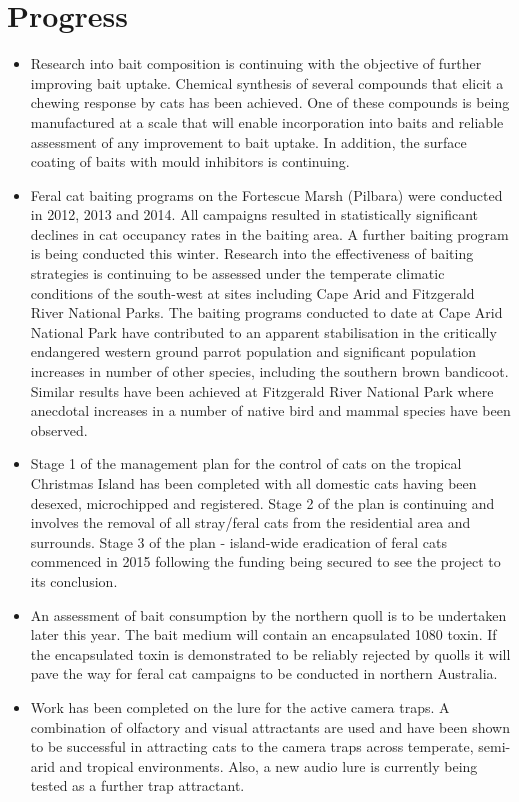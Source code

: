 \documentclass[version=last, 
    paper=a4, %
    10pt, %
    usenames,
    dvipsnames, 
    oneside, %
    headings=openany, %
    DIV=15 %
]{scrbook}
\begin{document}
\section*{Progress}
\begin{itemize}
\itemsep1pt\parskip0pt
\item
  Research into bait composition is continuing with the objective of
  further improving bait uptake. Chemical synthesis of several compounds
  that elicit a chewing response by cats has been achieved. One of these
  compounds is being manufactured at a scale that will enable
  incorporation into baits and reliable assessment of any improvement to
  bait uptake. In addition, the surface coating of baits with mould
  inhibitors is continuing.
\item
  Feral cat baiting programs on the Fortescue Marsh (Pilbara) were
  conducted in 2012, 2013 and 2014. All campaigns resulted in
  statistically significant declines in cat occupancy rates in the
  baiting area. A further baiting program is being conducted this
  winter. Research into the effectiveness of baiting strategies is
  continuing to be assessed under the temperate climatic conditions of
  the south-west at sites including Cape Arid and Fitzgerald River
  National Parks. The baiting programs conducted to date at Cape Arid
  National Park have contributed to an apparent stabilisation in the
  critically endangered western ground parrot population and significant
  population increases in number of other species, including the
  southern brown bandicoot. Similar results have been achieved at
  Fitzgerald River National Park where anecdotal increases in a number
  of native bird and mammal species have been observed.
\item
  Stage 1 of the management plan for the control of cats on the tropical
  Christmas Island has been completed with all domestic cats having been
  desexed, microchipped and registered. Stage 2 of the plan is
  continuing and involves the removal of all stray/feral cats from the
  residential area and surrounds. Stage 3 of the plan - island-wide
  eradication of feral cats commenced in 2015 following the funding
  being secured to see the project to its conclusion.
\item
  An assessment of bait consumption by the northern quoll is to be
  undertaken later this year. The bait medium will contain an
  encapsulated 1080 toxin. If the encapsulated toxin is demonstrated to
  be reliably rejected by quolls it will pave the way for feral cat
  campaigns to be conducted in northern Australia.
\item
  Work has been completed on the lure for the active camera traps. A
  combination of olfactory and visual attractants are used and have been
  shown to be successful in attracting cats to the camera traps across
  temperate, semi-arid and tropical environments. Also, a new audio lure
  is currently being tested as a further trap attractant.
\end{itemize}
\end{document}
